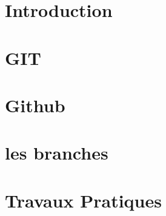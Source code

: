 \documentclass[11pt,fleqn]{book} %
\begin{document}






\chapter{Introduction}



\chapter{GIT}



\chapter{Github}



\chapter{les branches}



\chapter{Travaux Pratiques}


\end{document}
